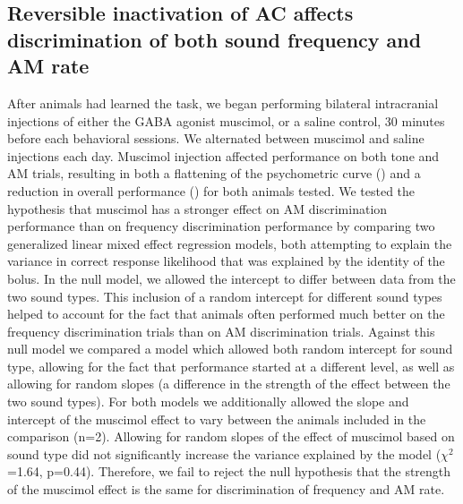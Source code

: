 \subsection{Reversible inactivation of AC affects discrimination of both sound
frequency and AM rate} After animals had learned the task, we began performing
bilateral intracranial injections of either the GABA agonist muscimol, or a
saline control, 30 minutes before each behavioral sessions.
%
We alternated between muscimol and saline injections each day. 
%
Muscimol injection affected performance on both tone and AM trials, resulting
in both a flattening of the psychometric curve (\fig{\amodPsychometrics}) and a
reduction in overall performance (\fig{\amodCorrect}) for both animals tested. 
%
We tested the hypothesis that muscimol has a stronger effect on AM
discrimination performance than on frequency discrimination performance by
comparing two generalized linear mixed effect regression models, both attempting
to explain the variance in correct response likelihood that was explained by the
identity of the bolus. 
%
In the null model, we allowed the intercept to differ between data from the two
sound types.
%
This inclusion of a random intercept for different sound types helped to account for the fact that animals often performed much better on the
frequency discrimination trials than on AM discrimination trials.
%
Against this null model we compared a model which allowed both random
intercept for sound type, allowing for the fact that performance started
at a different level, as well as allowing for random slopes (a difference in
the strength of the effect between the two sound types).
%
For both models we additionally allowed the slope and intercept of the muscimol
effect to vary between the animals included in the comparison (n=2). 
%
Allowing for random slopes of the effect of muscimol based on sound type did
not significantly increase the variance explained by the model
($\chi^{2}$=1.64, p=0.44).
%
Therefore, we fail to reject the null hypothesis that the strength of the
muscimol effect is the same for discrimination of frequency and AM rate. 

